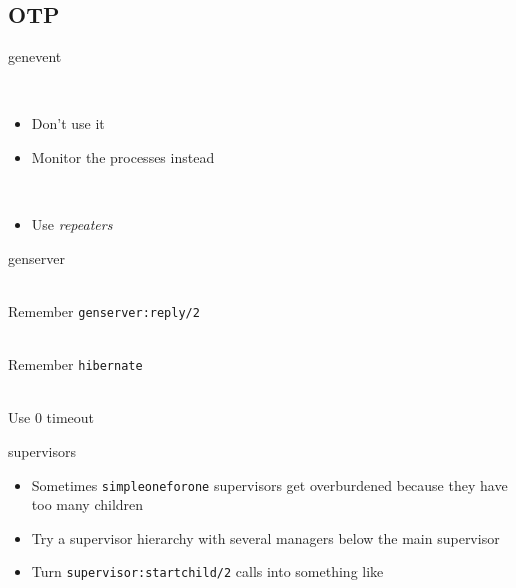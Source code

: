 \documentclass[utf8]{beamer}
\begin{document}
\subsection{OTP}
\begin{frame}{gen\textunderscore event}
	\begin{description}
		\item<+->[sup\textunderscore handler]\ \\
			\begin{itemize}
				\item Don't use it
				\item Monitor the processes instead
			\end{itemize}
		\item<+->[Long Delivery Queues]\ \\
			\begin{itemize}
				\item Use \emph{repeaters}
			\end{itemize}
	\end{description}
\end{frame}
\begin{frame}{gen\textunderscore server}
	\begin{description}
		\item<+->[Call Timeouts]\ \\
			Remember \texttt{gen\textunderscore server:reply/2}
		\item<+->[Memory Footprint]\ \\
			Remember \texttt{hibernate}
		\item<+->[Long \texttt{init/1}]\ \\
			Use $0$ timeout
	\end{description}
\end{frame}
\begin{frame}{supervisors}
	\begin{itemize}
		\item Sometimes \texttt{simple\textunderscore one\textunderscore for\textunderscore one} supervisors get \alert{overburdened} because they have too many children
		\item Try a supervisor hierarchy with several managers below the main supervisor
		\item Turn \texttt{supervisor:start\textunderscore child/2} calls into something like
		\startchild
	\end{itemize}
\end{frame}
\end{document}
